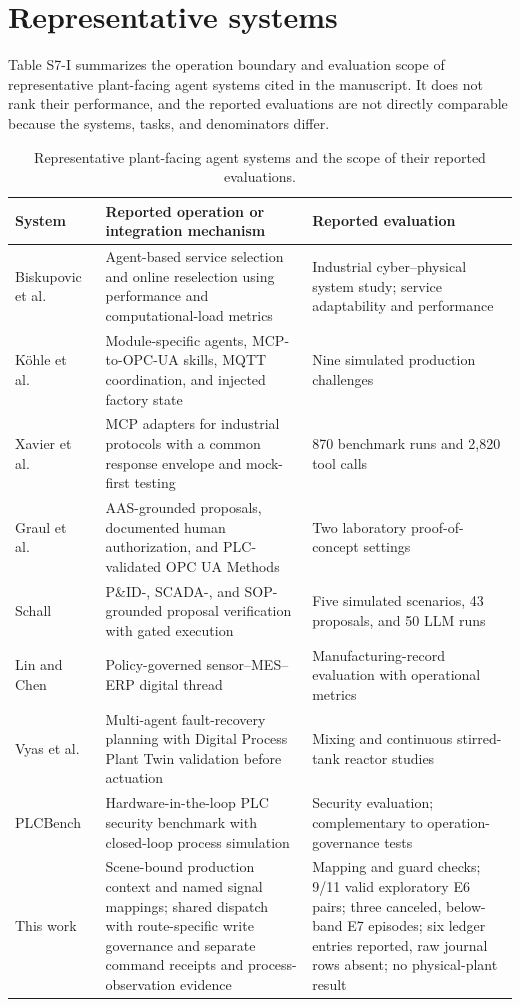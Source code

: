\documentclass[10pt]{article}
\begin{document}
\section*{Representative systems}
Table S7-I summarizes the operation boundary and evaluation scope of representative plant-facing agent systems cited in the manuscript. It does not rank their performance, and the reported evaluations are not directly comparable because the systems, tasks, and denominators differ.

\begin{table}[htbp]
\centering
\caption{Representative plant-facing agent systems and the scope of their reported evaluations.}
\footnotesize
\setlength{\tabcolsep}{3pt}
\begin{tabularx}{\textwidth}{@{}>{\raggedright\arraybackslash}p{1.9cm}>{\raggedright\arraybackslash}p{6.2cm}X@{}}
\toprule
System & Reported operation or integration mechanism & Reported evaluation \\
\midrule
Biskupovic et al.~\cite{biskupovic2025supervision} & Agent-based service selection and online reselection using performance and computational-load metrics & Industrial cyber--physical system study; service adaptability and performance \\
K{\"o}hle et al.~\cite{koehle2026llmdriven} & Module-specific agents, MCP-to-OPC-UA skills, MQTT coordination, and injected factory state & Nine simulated production challenges \\
Xavier et al.~\cite{xavier2026industriConnect} & MCP adapters for industrial protocols with a common response envelope and mock-first testing & 870 benchmark runs and 2,820 tool calls \\
Graul et al.~\cite{graul2026aas} & AAS-grounded proposals, documented human authorization, and PLC-validated OPC UA Methods & Two laboratory proof-of-concept settings \\
Schall~\cite{schall2026safe} & P\&ID-, SCADA-, and SOP-grounded proposal verification with gated execution & Five simulated scenarios, 43 proposals, and 50 LLM runs \\
Lin and Chen~\cite{lin2026agentic} & Policy-governed sensor--MES--ERP digital thread & Manufacturing-record evaluation with operational metrics \\
Vyas et al.~\cite{vyas2026detection} & Multi-agent fault-recovery planning with Digital Process Plant Twin validation before actuation & Mixing and continuous stirred-tank reactor studies \\
PLCBench~\cite{zhou2026plcbench} & Hardware-in-the-loop PLC security benchmark with closed-loop process simulation & Security evaluation; complementary to operation-governance tests \\
This work & Scene-bound production context and named signal mappings; shared dispatch with route-specific write governance and separate command receipts and process-observation evidence & Mapping and guard checks; 9/11 valid exploratory E6 pairs; three canceled, below-band E7 episodes; six ledger entries reported, raw journal rows absent; no physical-plant result \\
\bottomrule
\end{tabularx}
\end{table}
\end{document}
